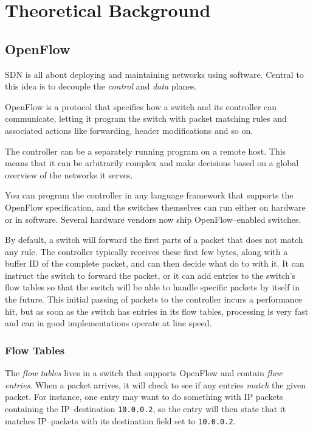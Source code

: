 \chapter{Theoretical Background}

\section{OpenFlow}

\acf{SDN} is all about deploying and maintaining networks using software.
Central to this idea is to decouple the \textit{control} and \textit{data}
planes.

OpenFlow is a protocol that specifies how a switch and its controller can
communicate, letting it program the switch with packet matching rules and
associated actions like forwarding, header modifications and so on.

The controller can be a separately running program on a remote host. This
means that it can be arbitrarily complex and make decisions based on a
global overview of the networks it serves.

You can program the controller in any language framework that supports the
OpenFlow specification, and the switches themselves can run either on
hardware or in software.  Several hardware vendors now ship
OpenFlow--enabled switches.

By default, a switch will forward the first parts of a packet that does not
match any rule.  The controller typically receives these first few bytes,
along with a buffer ID of the complete packet, and can then decide
what do to with it.  It can instruct the switch to forward the packet,
or it can add entries to the switch's flow tables so that the switch
will be able to handle specific packets by itself in the future.  This
initial passing of packets to the controller incurs a performance hit,
but as soon as the switch has entries in its flow tables, processing
is very fast and can in good implementations operate at line speed.

\subsection{Flow Tables}

The \textit{flow tables} lives in a switch that supports OpenFlow and
contain \textit{flow entries}.  When a packet arrives, it will check to see
if any entries \textit{match} the given packet.  For instance, one entry may
want to do something with \ac{IP} packets containing the IP--destination
\texttt{10.0.0.2}, so the entry
will then state that it matches IP--packets with its destination field set
to \texttt{10.0.0.2}.

